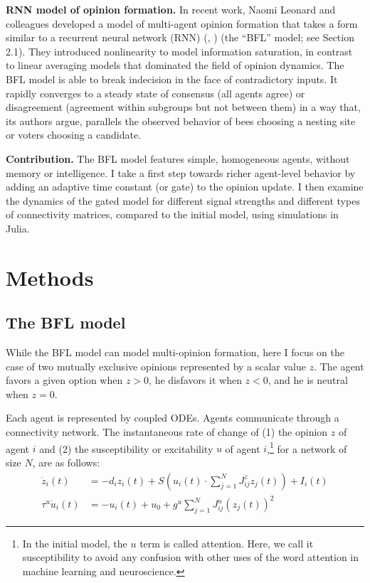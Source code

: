 \documentclass[]{article}
\begin{document}
\textbf{RNN model of opinion formation.} In recent work, Naomi Leonard and colleagues developed a model of multi-agent opinion formation that takes a form similar to a recurrent neural network (RNN) (\cite{bizyaevaNonlinearOpinionDynamics2022}, \cite{leonardFastFlexibleMultiAgent2024}) (the “BFL” model; see Section 2.1). They introduced nonlinearity to model information saturation, in contrast to linear averaging models that dominated the field of opinion dynamics. The BFL model is able to break indecision in the face of contradictory inputs. It rapidly converges to a steady state of consensus (all agents agree) or disagreement (agreement within subgroups but not between them) in a way that, its authors argue, parallels the observed behavior of bees choosing a nesting site or voters choosing a candidate.

\textbf{Contribution.} The BFL model features simple, homogeneous agents, without memory or intelligence. I take a first step towards richer agent-level behavior by adding an adaptive time constant (or gate) to the opinion update. I then examine the dynamics of the gated model for different signal strengths and different types of connectivity matrices, compared to the initial model, using simulations in Julia.

\section{Methods}
\subsection{The BFL model}

While the BFL model can model multi-opinion formation, here I focus on the case of two mutually exclusive opinions represented by a scalar value $z$. The agent favors a given option when $z>0$, he disfavors it when $z<0$, and he is neutral when $z = 0$.

Each agent is represented by coupled ODEs. Agents communicate through a connectivity network. The instantaneous rate of change of (1) the opinion $z$ of agent $i$ and (2) the susceptibility or excitability $u$ of agent $i$,\footnote{In the initial model, the $u$ term is called attention. Here, we call it susceptibility to avoid any confusion with other uses of the word attention in machine learning and neuroscience.} for a network of size $N$, are as follows:
\begin{align}
	\dot{z}_{i}(t) &= -d_{i}z_{i}(t) + S \left( u_i(t) \cdot  \sum^{N}_{j=1} J^z_{ij}z_{j}(t)  \right) + I_{i}(t) \\
	\tau^u \dot{u}_i(t) &= -u_i(t)+u_0+g^u \sum ^{N}_{j=1} J^u_{ij}(z_{j}(t))^2
\end{align}
\end{document}
